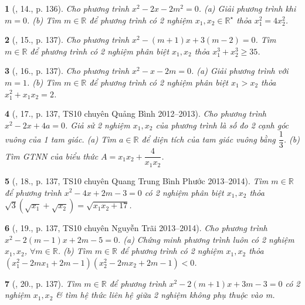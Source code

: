 \documentclass{article}
\newtheorem{baitoan}{}
\begin{document}
\begin{baitoan}[\cite{Thu_Viet_Minh_ptb2}, 14., p. 136]
	Cho phương trình $x^2 - 2x - 2m^2 = 0$. (a) Giải phương trình khi $m = 0$. (b) Tìm $m\in\mathbb{R}$ để phương trình có 2 nghiệm $x_1,x_2\in\mathbb{R}^\star$ thỏa $x_1^2 = 4x_2^2$.
\end{baitoan}

\begin{baitoan}[\cite{Thu_Viet_Minh_ptb2}, 15., p. 137]
	Cho phương trình $x^2 - (m + 1)x + 3(m - 2) = 0$. Tìm $m\in\mathbb{R}$ để phương trình có 2 nghiệm phân biệt $x_1,x_2$ thỏa $x_1^3 + x_2^3\ge35$.
\end{baitoan}

\begin{baitoan}[\cite{Thu_Viet_Minh_ptb2}, 16., p. 137]
	Cho phương trình $x^2 - x - 2m = 0$. (a) Giải phương trình với $m = 1$. (b) Tìm $m\in\mathbb{R}$ để phương trình có 2 nghiệm phân biệt $x_1 > x_2$ thỏa $x_1^2 + x_1x_2 = 2$.
\end{baitoan}

\begin{baitoan}[\cite{Thu_Viet_Minh_ptb2}, 17., p. 137, TS10 chuyên Quảng Bình 2012--2013]
	Cho phương trình $x^2 - 2x + 4a = 0$. Giả sử 2 nghiệm $x_1,x_2$ của phương trình là số đo 2 cạnh góc vuông của 1 tam giác. (a) Tìm $a\in\mathbb{R}$ để diện tích của tam giác vuông bằng $\dfrac{1}{3}$. (b) Tìm {\rm GTNN} của biểu thức $A = x_1x_2 + \dfrac{4}{x_1x_2}$.
\end{baitoan}

\begin{baitoan}[\cite{Thu_Viet_Minh_ptb2}, 18., p. 137, TS10 chuyên Quang Trung Bình Phước 2013--2014]
	Tìm $m\in\mathbb{R}$ để phương trình $x^2 - 4x + 2m - 3 = 0$ có 2 nghiệm phân biệt $x_1,x_2$ thỏa $\sqrt{3}(\sqrt{x_1} + \sqrt{x_2}) = \sqrt{x_1x_2 + 17}$.
\end{baitoan}

\begin{baitoan}[\cite{Thu_Viet_Minh_ptb2}, 19., p. 137, TS10 chuyên Nguyễn Trãi 2013--2014]
	Cho phương trình $x^2 - 2(m - 1)x + 2m - 5 = 0$. (a) Chứng minh phương trình luôn có 2 nghiệm $x_1,x_2$, $\forall m\in\mathbb{R}$. (b) Tìm $m\in\mathbb{R}$ để phương trình có 2 nghiệm $x_1,x_2$ thỏa $(x_1^2 - 2mx_1 + 2m - 1)(x_2^2 - 2mx_2 + 2m - 1) < 0$.
\end{baitoan}

\begin{baitoan}[\cite{Thu_Viet_Minh_ptb2}, 20., p. 137]
	Tìm $m\in\mathbb{R}$ để phương trình $x^2 - 2(m + 1)x + 3m - 3 = 0$ có 2 nghiệm $x_1,x_2$ \& tìm hệ thức liên hệ giữa 2 nghiệm không phụ thuộc vào m.
\end{baitoan}
\end{document}
